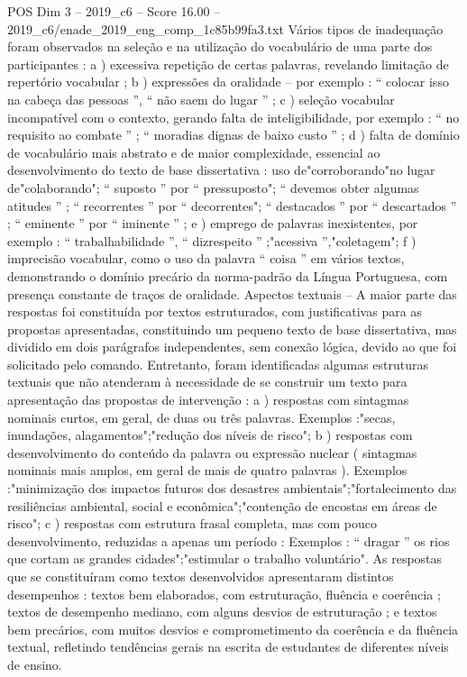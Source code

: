 \begin{textsample}{POS Dim 3 – 2019\_c6 – Score 16.00 – 2019\_c6/enade\_2019\_eng\_comp\_1c85b99fa3.txt}
Vários tipos de inadequação foram observados na seleção e na utilização do vocabulário de uma parte dos participantes : a ) excessiva repetição de certas palavras, revelando limitação de repertório vocabular ; b ) expressões da oralidade – por exemplo : “ colocar isso na cabeça das pessoas ”, “ não saem do lugar ” ; c ) seleção vocabular incompatível com o contexto, gerando falta de inteligibilidade, por exemplo : “ no requisito ao combate ” ; “ moradias dignas de baixo custo ” ; d ) falta de domínio de vocabulário mais abstrato e de maior complexidade, essencial ao desenvolvimento do texto de base dissertativa : uso de"corroborando"no lugar de"colaborando"; “ suposto ” por “ pressuposto"; “ devemos obter algumas atitudes ” ; “ recorrentes ” por “ decorrentes"; “ destacados ” por “ descartados ” ; “ eminente ” por “ iminente ” ; e ) emprego de palavras inexistentes, por exemplo : “ trabalhabilidade ”, “ dizrespeito ” ;"acessiva ”,"coletagem"; f ) imprecisão vocabular, como o uso da palavra “ coisa ” em vários textos, demonstrando o domínio precário da norma-padrão da Língua Portuguesa, com presença constante de traços de oralidade.
Aspectos textuais – A maior parte das respostas foi constituída por textos estruturados, com justificativas para as propostas apresentadas, constituindo um pequeno texto de base dissertativa, mas dividido em dois parágrafos independentes, sem conexão lógica, devido ao que foi solicitado pelo comando.
Entretanto, foram identificadas algumas estruturas textuais que não atenderam à necessidade de se construir um texto para apresentação das propostas de intervenção : a ) respostas com sintagmas nominais curtos, em geral, de duas ou três palavras.
Exemplos :"secas, inundações, alagamentos";"redução dos níveis de risco"; b ) respostas com desenvolvimento do conteúdo da palavra ou expressão nuclear ( sintagmas nominais mais amplos, em geral de mais de quatro palavras ).
Exemplos :"minimização dos impactos futuros dos desastres ambientais";"fortalecimento das resiliências ambiental, social e econômica";"contenção de encostas em áreas de risco"; c ) respostas com estrutura frasal completa, mas com pouco desenvolvimento, reduzidas a apenas um período : Exemplos : “ dragar ” os rios que cortam as grandes cidades";"estimular o trabalho voluntário".
As respostas que se constituíram como textos desenvolvidos apresentaram distintos desempenhos : textos bem elaborados, com estruturação, fluência e coerência ; textos de desempenho mediano, com alguns desvios de estruturação ; e textos bem precários, com muitos desvios e comprometimento da coerência e da fluência textual, refletindo tendências gerais na escrita de estudantes de diferentes níveis de ensino.

\end{textsample}
